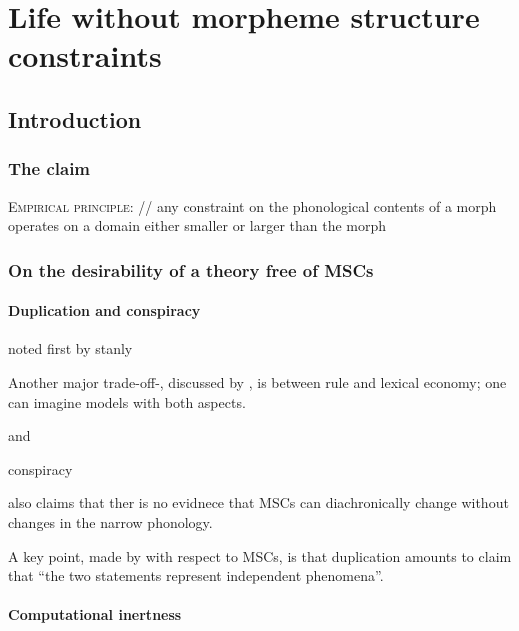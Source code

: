\chapter{Life without morpheme structure constraints}

\section{Introduction}

\subsection{The claim}

\ex \textsc{Empirical principle}: // any constraint on the phonological contents of a morph operates on a domain either smaller or larger than the morph \xe

\subsection{On the desirability of a theory free of MSCs}

\subsubsection{Duplication and conspiracy} 

noted first by stanly

\citet[][401]{Stanley1967}

Another major trade-off-, discussed by \citet[][?]{Harms1968}, is between rule and lexical economy; one can imagine models with both aspects.

\citet[][?]{Kisseberth1970}
and 
\citet[][?]{Kenstowicz1977}

conspiracy

\citet[][]{Shibatani1973} 

\citet[][310f.]{Clayton1976} also claims that ther is no evidnece that MSCs can diachronically change without changes in the narrow phonology.

A key point, made by \citet[][301]{Clayton1976} with respect to MSCs, is that duplication amounts to claim that ``the two statements represent independent phenomena''. 


\subsubsection{Computational inertness} 

